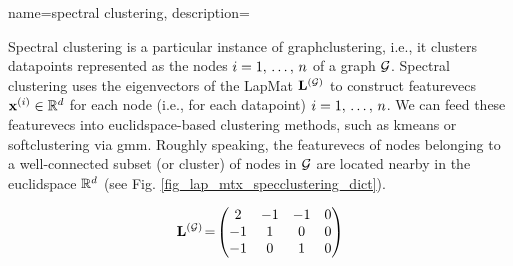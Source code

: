 {name={spectral clustering},
	description={Spectral \gls{clustering} is a particular instance of 
		\gls{graphclustering}, i.e., it clusters \glspl{datapoint} 
		represented as the nodes $i=1, \,\ldots, \,n$ of a \gls{graph} $\mathcal{G}$. 
		Spectral \gls{clustering} uses the \glspl{eigenvector} of the \gls{LapMat} ${\bf L}^{(\mathcal{G})}$ 
		to construct \glspl{featurevec} ${\bf x}^{(i)} \in \mathbb{R}^{d}$ 
		for each node (i.e., for each \gls{datapoint}) $i=1, \,\ldots, \,n$. We can feed these \glspl{featurevec} 
		into \gls{euclidspace}-based \gls{clustering} methods, such as \gls{kmeans} 
		or \gls{softclustering} via \gls{gmm}. Roughly speaking, the \glspl{featurevec} of nodes 
		belonging to a well-connected subset (or \gls{cluster}) of nodes in $\mathcal{G}$ are located 
		nearby in the \gls{euclidspace} $\mathbb{R}^{d}$ (see Fig. \ref{fig_lap_mtx_specclustering_dict}). 
		\begin{figure}[H]
			\begin{center}
				\begin{minipage}{0.4\textwidth}
				\end{minipage} 
				\hspace*{5mm}
				\begin{minipage}{0.4\textwidth}
					\begin{equation} 
						{\bf L}^{(\mathcal{G})}\!=\!
						\begin{pmatrix} 
							2 & -1 & -1 & 0 \\ 
							-1 & 1 & 0 & 0 \\  
							-1 & 0 & 1 & 0 \\ 

\end{pmatrix}
\end{equation}
\end{minipage}
\end{center}
\end{figure}}}
